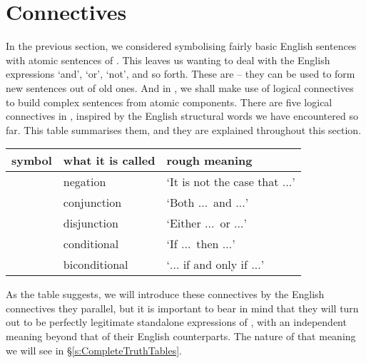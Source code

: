 \chapter{Connectives}\label{s:TFLConnectives}
In the previous section, we considered symbolising fairly basic English sentences with atomic sentences of \TFL. This leaves us wanting to deal with the English expressions `and', `or', `not', and so forth. These are  – they can be used to form new sentences out of old ones. And in \TFL, we shall make use of logical connectives to build complex sentences from atomic components. There are five logical connectives in \TFL, inspired by the English structural words we have encountered so far. This table summarises them, and they are explained throughout this section. 

	\begin{table}[h]
	\center
	\begin{tabular}{l l l} \toprule 
	
	\textbf{symbol}&\textbf{what it is called}&\textbf{rough meaning}\\
	\midrule
	\enot&negation&`It is not the case that $…$'\\
	\eand&conjunction&`Both $…$\ and $…$'\\
	\eor&disjunction&`Either $…$\ or $…$'\\
	\eif&conditional&`If $…$\ then $…$'\\
	\eiff&biconditional&`$…$ if and only if $…$'\\
	
	\bottomrule \end{tabular}
	\end{table}

As the table suggests, we will introduce these connectives by the English connectives they parallel, but it is important to bear in mind that they will turn out to be perfectly legitimate standalone expressions of \TFL, with an independent meaning beyond that of their English counterparts. The nature of that meaning we will see in §\ref{s:CompleteTruthTables}.


